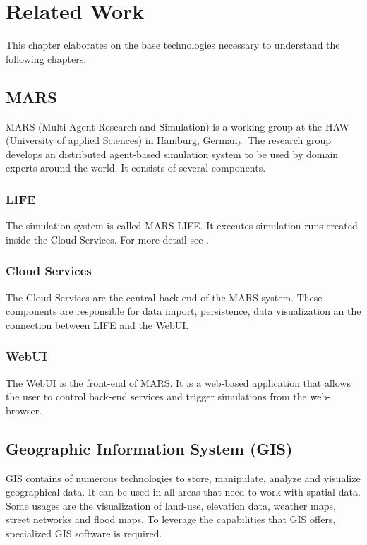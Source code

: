 
\chapter{Related Work}
This chapter elaborates on the base technologies necessary to understand the following chapters.



\section{MARS}
MARS (Multi-Agent Research and Simulation) is a working group at the HAW (University of applied Sciences) in Hamburg, Germany. The research group develops an distributed agent-based simulation system to be used by domain experts around the world. It consists of several components.


\subsection{LIFE}
The simulation system is called MARS LIFE. It executes simulation runs created inside the Cloud Services. For more detail see \cite{Huning2016}.


\subsection{Cloud Services}
The Cloud Services are the central back-end of the MARS system. These components are responsible for data import, persistence, data visualization an the connection between LIFE and the WebUI.


\subsection{WebUI}
The WebUI is the front-end of MARS. It is a web-based application that allows the user to control back-end services and trigger simulations from the web-browser.



\section{Geographic Information System (GIS)}
GIS contains of numerous technologies to store, manipulate, analyze and visualize geographical data. It can be used in all areas that need to work with spatial data. Some usages are the visualization of land-use, elevation data, weather maps, street networks and flood maps. To leverage the capabilities that GIS offers, specialized GIS software is required.


